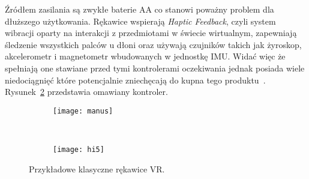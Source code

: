 Źródłem zasilania są zwykłe baterie AA co stanowi poważny problem dla dłuższego użytkowania. Rękawice wspierają \textit{Haptic Feedback}, czyli system wibracji oparty na interakcji z przedmiotami w świecie wirtualnym, zapewniają śledzenie wszystkich palców u dłoni oraz używają czujników takich jak żyroskop, akcelerometr i magnetometr wbudowanych w jednostkę IMU. Widać więc że spełniają one stawiane przed tymi kontrolerami oczekiwania jednak posiada wiele niedociągnięć które potencjalnie zniechęcają do kupna tego produktu~\cite{hi5}. Rysunek~\ref{fig:hi5} przedstawia omawiany kontroler.
\begin{figure}[h]
\centering
	\begin{subfigure}[b]{0.4\textwidth}
	\texttt{[image: manus]}
	\label{fig:manus}
	\end{subfigure}
	~
	\begin{subfigure}[b]{0.34\textwidth}
	\texttt{[image: hi5]}
	\label{fig:hi5}
	\end{subfigure}
\caption{Przykładowe klasyczne rękawice VR.}
\label{fig:rekawice}
\end{figure}	
